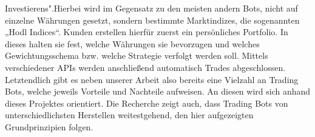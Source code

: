 \documentclass[sigconf]{acmart}
\begin{document}
Investierens".\newline Hierbei wird im Gegensatz zu den meisten andern Bots, nicht auf einzelne Währungen
gesetzt, sondern bestimmte Marktindizes, die sogenannten „Hodl Indices“. Kunden erstellen hierfür
zuerst ein persönliches Portfolio. In dieses halten sie fest, welche Währungen sie bevorzugen und
welches Gewichtungsschema bzw. welche Strategie verfolgt werden soll. Mittels verschiedener APIs
werden anschließend automatisch Trades abgeschlossen.\newline
Letztendlich gibt es neben unserer Arbeit also bereits eine Vielzahl an Trading Bots, welche jeweils
Vorteile und Nachteile aufweisen. An diesen wird sich anhand dieses Projektes orientiert. Die
Recherche zeigt auch, dass Trading Bots von unterschiedlichsten Herstellen weitestgehend, den hier
aufgezeigten Grundprinzipien folgen.






\listoffigures
\end{document}
